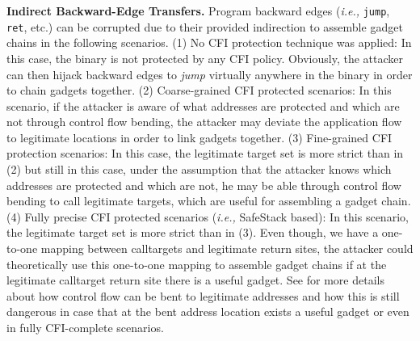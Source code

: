 
\textbf{Indirect Backward-Edge Transfers.} 
Program backward edges (\textit{i.e.,} \texttt{jump}, \texttt{ret}, etc.) can be corrupted due to their provided indirection to assemble gadget chains in the following scenarios.
(1) No CFI protection technique was applied: In this case, the binary is not protected by any CFI policy. Obviously, the attacker can then hijack backward edges to \textit{jump} virtually 
anywhere in the binary in order to chain gadgets together.
(2) Coarse-grained CFI protected scenarios: In this scenario, if the attacker is aware of what addresses are protected and which are not through control flow bending, the attacker may deviate
the application flow to legitimate locations in order to link gadgets together.
(3) Fine-grained CFI protection scenarios: In this case, the legitimate target set is more strict than in (2) but still in this case, under the assumption that the attacker knows
which addresses are protected and which are not, he may be able through control flow bending to call legitimate targets, which are useful for assembling a gadget chain.
(4) Fully precise CFI protected scenarios (\textit{i.e.,} SafeStack \cite{volodymyr:cpi} based): In this scenario, the legitimate target set is more strict than in (3). Even though, we 
have a one-to-one mapping 
between calltargets and legitimate return sites, the attacker could theoretically use this one-to-one mapping to assemble gadget chains if at the legitimate calltarget return site there is a useful gadget. 
See \cite{carlini:bending} for more details about how control flow can be bent to legitimate addresses and how this is still dangerous in 
case that at the bent address location exists a useful gadget or even in fully CFI-complete scenarios. 

